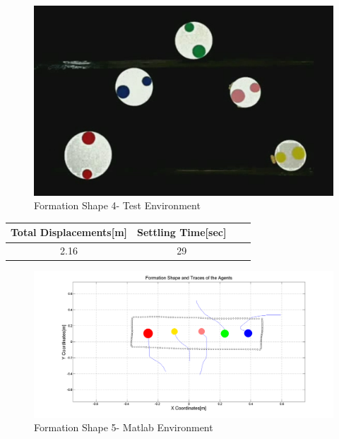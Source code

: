 \begin{figure}[H]
\caption{Formation Shape 4- Test Environment}
\centerline{\includegraphics[scale = 0.35]{6_real_hardware}}
\end{figure} 
					
\begin{center}
 \label{hardwareshape4_ref} 
\begin{tabular}{||c| c |c |c ||}
\hline
\textbf{Total Displacements[m]}  & \textbf{Settling Time[sec]}\\ 
\hline
2.16 & 29 \\
\hline
\end{tabular}
\end{center}
		
\begin{figure}[H]
\caption{Formation Shape 5- Matlab Environment}
\centerline{\includegraphics[scale = 0.32]{9_hardware}}
\end{figure} 
					
